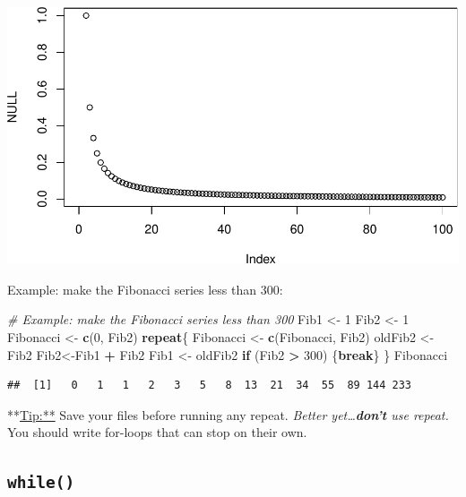 \documentclass[]{article}
\newenvironment{Shaded}{\begin{snugshade}}{\end{snugshade}}
\newcommand{\KeywordTok}[1]{\textcolor[rgb]{0.13,0.29,0.53}{\textbf{#1}}}
\newcommand{\DecValTok}[1]{\textcolor[rgb]{0.00,0.00,0.81}{#1}}
\newcommand{\StringTok}[1]{\textcolor[rgb]{0.31,0.60,0.02}{#1}}
\newcommand{\CommentTok}[1]{\textcolor[rgb]{0.56,0.35,0.01}{\textit{#1}}}
\newcommand{\ControlFlowTok}[1]{\textcolor[rgb]{0.13,0.29,0.53}{\textbf{#1}}}
\newcommand{\OperatorTok}[1]{\textcolor[rgb]{0.81,0.36,0.00}{\textbf{#1}}}
\newcommand{\NormalTok}[1]{#1}
\begin{document}
\includegraphics{Lab4_Matrix_Algebra_Functions_files/figure-latex/break1-1.pdf}

Example: make the Fibonacci series less than 300:

\begin{Shaded}
\begin{Highlighting}[]
\CommentTok{# Example: make the Fibonacci series less than 300}
\NormalTok{Fib1 <-}\StringTok{ }\DecValTok{1}
\NormalTok{Fib2 <-}\StringTok{ }\DecValTok{1}
\NormalTok{Fibonacci <-}\StringTok{ }\KeywordTok{c}\NormalTok{(}\DecValTok{0}\NormalTok{, Fib2)}
\ControlFlowTok{repeat}\NormalTok{\{}
\NormalTok{  Fibonacci <-}\StringTok{ }\KeywordTok{c}\NormalTok{(Fibonacci, Fib2)}
\NormalTok{  oldFib2 <-}\StringTok{ }\NormalTok{Fib2}
\NormalTok{  Fib2<-Fib1 }\OperatorTok{+}\StringTok{ }\NormalTok{Fib2}
\NormalTok{  Fib1 <-}\StringTok{ }\NormalTok{oldFib2}
  \ControlFlowTok{if}\NormalTok{ (Fib2 }\OperatorTok{>}\StringTok{ }\DecValTok{300}\NormalTok{) \{}\ControlFlowTok{break}\NormalTok{\}}
\NormalTok{\}}
\NormalTok{Fibonacci}
\end{Highlighting}
\end{Shaded}

\begin{verbatim}
##  [1]   0   1   1   2   3   5   8  13  21  34  55  89 144 233
\end{verbatim}

**\url{Tip:**} Save your files before running any repeat. \emph{Better
yet\ldots{}\textbf{don't} use repeat.} You should write for-loops that
can stop on their own.

\clearpage

\subsection{\texorpdfstring{\texttt{while()}}{while()}}\label{while}
\end{document}
